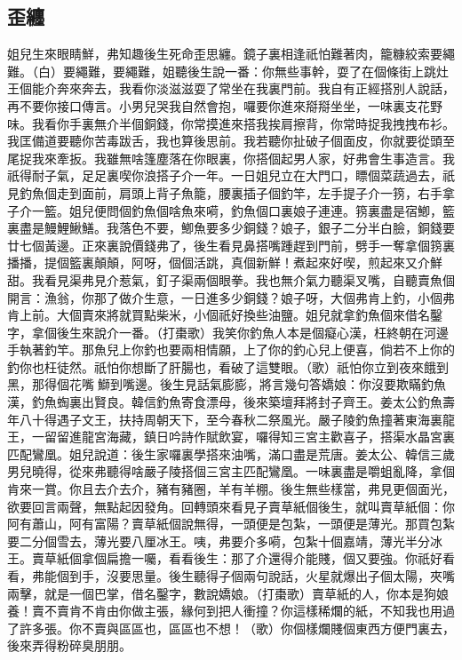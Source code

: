 \subsection*{歪纏}

姐兒生來眼睛鮮，弗知趣後生死命歪思纏。鏡子裏相逢祇怕難著肉，籠糠絞索要繩難。（白）要繩難，要繩難，姐聽後生說一番：你無些事幹，耍了在個條街上跳灶王個能介奔來奔去，我看你淡滋滋耍了常坐在我裏門前。我自有正經搭別人說話，再不要你接口傳言。小男兒哭我自然會抱，囉要你進來搿搿坐坐，一味裏支花野味。我看你手裏無介半個銅錢，你常摸進來搭我挨肩擦背，你常時捉我拽拽布衫。我匡備道要聽你苦毒跋舌，我也算後思前。我若聽你扯破子個面皮，你就要從頭至尾捉我來牽扳。我雖無啥篷塵落在你眼裏，你搭個起男人家，好弗會生事造言。我祇得耐子氣，足足裏喫你浪搭子介一年。一日姐兒立在大門口，瞟個菜蔬過去，祇見釣魚個走到面前，肩頭上背子魚籠，腰裏插子個釣竿，左手提子介一箉，右手拿子介一籃。姐兒便問個釣魚個啥魚來嗬，釣魚個口裏娘子連連。箉裏盡是宿鯽，籃裏盡是鰻鯉鰍鱔。我落色不要，鯽魚要多少銅錢？娘子，銀子二分半白臉，銅錢要廿七個黃邊。正來裏說價錢弗了，後生看見鼻搭嘴踵趕到門前，劈手一奪拿個箉裏播播，提個籃裏顛顛，阿呀，個個活跳，真個新鮮！煮起來好喫，煎起來又介鮮甜。我看見渠弗見介惹氣，釘子渠兩個眼拳。我也無介氣力聽渠叉嘴，自聽賣魚個開言：漁翁，你那了做介生意，一日進多少銅錢？娘子呀，大個弗肯上釣，小個弗肯上前。大個賣來將就買點柴米，小個祇好換些油鹽。姐兒就拿釣魚個來借名鑿字，拿個後生來說介一番。（打棗歌）我笑你釣魚人本是個癡心漢，枉終朝在河邊手執著釣竿。那魚兒上你釣也要兩相情願，上了你的釣心兒上便喜，倘若不上你的釣你也枉徒然。祇怕你想斷了肝腸也，看破了這雙眼。（歌）祇怕你立到夜來餓到黑，那得個花嘴𩵌鰤到嘴邊。後生見話氣膨膨，將言幾句答嬌娘：你沒要欺瞞釣魚漢，釣魚蜪裏出賢良。韓信釣魚寄食漂母，後來築壇拜將封子齊王。姜太公釣魚壽年八十得遇子文王，扶持周朝天下，至今春秋二祭風光。嚴子陵釣魚撞著東海裏龍王，一留留進龍宮海藏，鎮日吟詩作賦飲宴，囉得知三宮主歡喜子，搭渠水晶宮裏匹配鸞凰。姐兒說道：後生家囉裏學搭來油嘴，滿口盡是荒唐。姜太公、韓信三歲男兒曉得，從來弗聽得啥嚴子陵搭個三宮主匹配鸞凰。一味裏盡是嚼蛆亂降，拿個肯來一賞。你且去介去介，豬有豬圈，羊有羊棚。後生無些樣當，弗見更個面光，欲要回言兩聲，無點起因發角。回轉頭來看見子賣草紙個後生，就叫賣草紙個：你阿有蕭山，阿有富陽？賣草紙個說無得，一頭便是包紮，一頭便是薄光。那買包紮要二分個雪去，薄光要八厘冰王。咦，弗要介多嗬，包紮十個嘉靖，薄光半分冰王。賣草紙個拿個扁擔一囑，看看後生：那了介還得介能賤，個又要強。你祇好看看，弗能個到手，沒要思量。後生聽得子個兩句說話，火星就爆出子個太陽，夾嘴兩擊，就是一個巴掌，借名鑿字，數說嬌娘。（打棗歌）賣草紙的人，你本是狗娘養！賣不賣肯不肯由你做主張，緣何到把人衝撞？你這樣稀爛的紙，不知我也用過了許多張。你不賣與區區也，區區也不想！（歌）你個樣爛賤個東西方便門裏去，後來弄得粉碎臭朋朋。


